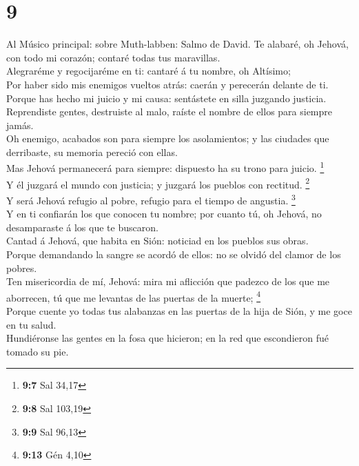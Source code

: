 \hypertarget{section-8}{%
\section{9}\label{section-8}}

 Al Músico principal: sobre Muth-labben: Salmo de David.
Te alabaré, oh Jehová, con todo mi corazón; contaré todas tus
maravillas.\\
 Alegraréme y regocijaréme en ti: cantaré á tu nombre, oh
Altísimo;\\
 Por haber sido mis enemigos vueltos atrás: caerán y
perecerán delante de ti.\\
 Porque has hecho mi juicio y mi causa: sentástete en
silla juzgando justicia.\\
 Reprendiste gentes, destruiste al malo, raíste el nombre
de ellos para siempre jamás.\\
 Oh enemigo, acabados son para siempre los asolamientos; y
las ciudades que derribaste, su memoria pereció con ellas.\\
 Mas Jehová permanecerá para siempre: dispuesto ha su
trono para juicio. \footnote{\textbf{9:7} Sal 34,17}\\
 Y él juzgará el mundo con justicia; y juzgará los pueblos
con rectitud. \footnote{\textbf{9:8} Sal 103,19}\\
 Y será Jehová refugio al pobre, refugio para el tiempo de
angustia. \footnote{\textbf{9:9} Sal 96,13}\\
 Y en ti confiarán los que conocen tu nombre; por cuanto
tú, oh Jehová, no desamparaste á los que te buscaron.\\
 Cantad á Jehová, que habita en Sión: noticiad en los
pueblos sus obras.\\
 Porque demandando la sangre se acordó de ellos: no se
olvidó del clamor de los pobres.\\
 Ten misericordia de mí, Jehová: mira mi aflicción que
padezco de los que me aborrecen, tú que me levantas de las puertas de la
muerte; \footnote{\textbf{9:13} Gén 4,10}\\
 Porque cuente yo todas tus alabanzas en las puertas de
la hija de Sión, y me goce en tu salud.\\
 Hundiéronse las gentes en la fosa que hicieron; en la
red que escondieron fué tomado su pie.\\

